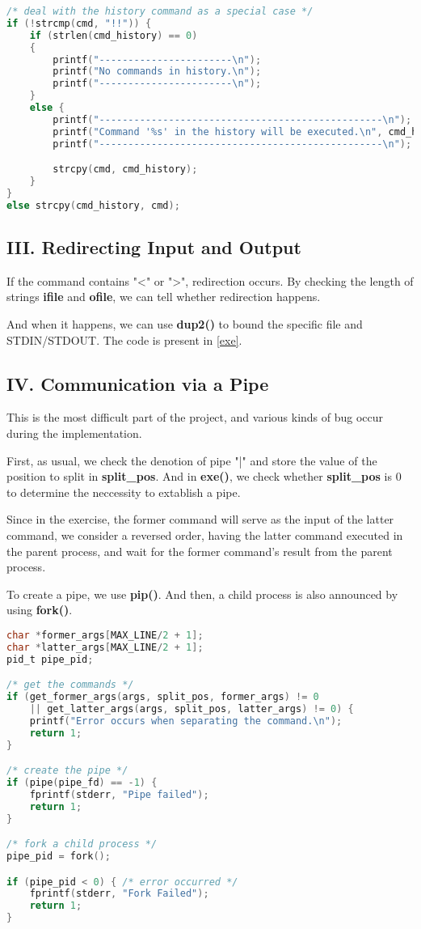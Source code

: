 \documentclass{article}
\begin{document}
\begin{lstlisting}[language=c, caption={history},captionpos=b]
/* deal with the history command as a special case */
if (!strcmp(cmd, "!!")) {
    if (strlen(cmd_history) == 0) 
    {
        printf("-----------------------\n");
        printf("No commands in history.\n");
        printf("-----------------------\n");
    }
    else {
        printf("-------------------------------------------------\n");
        printf("Command '%s' in the history will be executed.\n", cmd_history);
        printf("-------------------------------------------------\n");

        strcpy(cmd, cmd_history);
    }
}	
else strcpy(cmd_history, cmd);
\end{lstlisting}

\subsection*{III. Redirecting Input and Output}
If the command contains "<" or ">", redirection occurs. By checking the length of strings \textbf{ifile} and \textbf{ofile}, we can tell whether redirection happens. 

And when it happens, we can use \textbf{dup2()} to bound the specific file and STDIN/STDOUT. The code is present in \ref{exe}.

\subsection*{IV. Communication via a Pipe}
This is the most difficult part of the project, and various kinds of bug occur during the implementation. 

First, as usual, we check the denotion of pipe "|" and store the value of the position to split in \textbf{split\_pos}. And in \textbf{exe()}, we check whether \textbf{split\_pos} is $0$ to determine the neccessity to extablish a pipe. 

Since in the exercise, the former command will serve as the input of the latter command, we consider a reversed order, having the latter command executed in the parent process, and wait for the former command's result from the parent process. 

To create a pipe, we use \textbf{pip()}. And then, a child process is also announced by using \textbf{fork()}.

\begin{lstlisting}[language=c, caption={pipe()-I}, captionpos=b]
char *former_args[MAX_LINE/2 + 1];
char *latter_args[MAX_LINE/2 + 1];
pid_t pipe_pid;

/* get the commands */
if (get_former_args(args, split_pos, former_args) != 0 
    || get_latter_args(args, split_pos, latter_args) != 0) {
    printf("Error occurs when separating the command.\n");
    return 1;
}

/* create the pipe */
if (pipe(pipe_fd) == -1) {
    fprintf(stderr, "Pipe failed");
    return 1;
}

/* fork a child process */
pipe_pid = fork();

if (pipe_pid < 0) { /* error occurred */
    fprintf(stderr, "Fork Failed");
    return 1;
}
\end{lstlisting}
\end{document}
